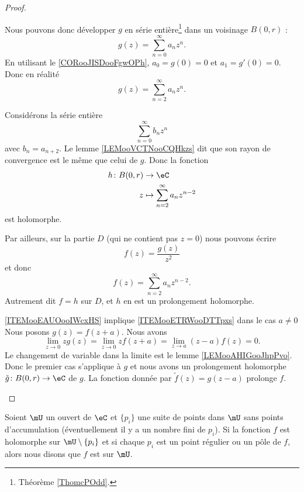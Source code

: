 \begin{proof}
\begin{subproof}
		Nous pouvons donc développer \( g\) en série entière\footnote{Théorème \ref{ThomcPOdd}.} dans un voisinage \( B(0,r)\) :
		\begin{equation}
			g(z)=\sum_{n=0}^{\infty}a_nz^n.
		\end{equation}
		En utilisant le \ref{CORooJISDooFgwOPh}, \( a_0=g(0)=0\) et \( a_1=g'(0)=0\). Donc en réalité
		\begin{equation}
			g(z)=\sum_{n=2}^{\infty}a_nz^n.
		\end{equation}

		Considérons la série entière
		\begin{equation}
			\sum_{n=0}^{\infty}b_nz^n
		\end{equation}
		avec \( b_n=a_{n+2}\). Le lemme \ref{LEMooVCTNooCQHkzs} dit que son rayon de convergence est le même que celui de \( g\). Donc la fonction
		\begin{equation}
			\begin{aligned}
				h\colon B(0,r) & \to \eC                               \\
				z              & \mapsto \sum_{n=2}^{\infty}a_nz^{n-2}
			\end{aligned}
		\end{equation}
		est holomorphe.

		Par ailleurs, sur la partie \( D\) (qui ne contient pas \( z=0\)) nous pouvons écrire
		\begin{equation}
			f(z)=\frac{ g(z) }{ z^2 }
		\end{equation}
		et donc
		\begin{equation}
			f(z)=\sum_{n=2}^{\infty}a_nz^{n-2}.
		\end{equation}
		Autrement dit \( f=h\) sur \( D\), et \( h\) en est un prolongement holomorphe.
		\item[\ref{ITEMooEAUOooIWcxHS} implique \ref{ITEMooETRWooDTTpxs} dans le cas \( a\neq 0\)]
		Nous posons \( g(z)=f(z+a)\). Nous avons
		\begin{equation}
			\lim_{z\to 0}zg(z)=\lim_{z\to 0}zf(z+a)=\lim_{z\to a}(z-a)f(z)=0.
		\end{equation}
		Le changement de variable dans la limite est le lemme \ref{LEMooAHIGooJhpPvo}. Donc le premier cas s'applique à \( g\) et nous avons un prolongement holomorphe \( \tilde g\colon B(0,r)\to \eC\) de \( g\). La fonction donnée par \( \tilde f(z)=g(z-a)\) prolonge \( f\).
	\end{subproof}
\end{proof}

\begin{definition}
	Soient \( \mU\) un ouvert de \( \eC\) et \( \{ p_i \}\) une suite de points dans \( \mU\) sans points d'accumulation (éventuellement il y a un nombre fini de \( p_i\)). Si la fonction \( f\) est holomorphe sur \( \mU\setminus\{ p_i \}\) et si chaque \( p_i\) est un point régulier ou un pôle de \( f\), alors nous disons que \( f\) est  sur \( \mU\).
\end{definition}

